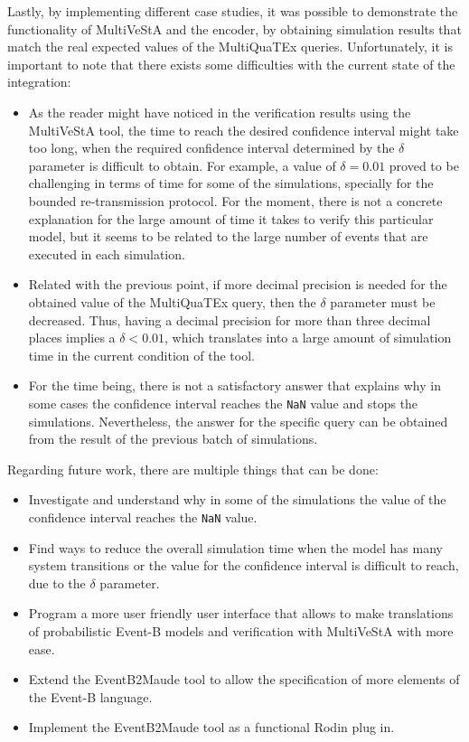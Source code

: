 Lastly, by implementing different case studies, it was possible to demonstrate the functionality of MultiVeStA and the encoder, by obtaining simulation results that match the real expected values of the MultiQuaTEx queries. Unfortunately, it is important to note that there exists some difficulties with the current state of the integration:
\begin{itemize}
    \item As the reader might have noticed in the verification results using the MultiVeStA tool, the time to reach the desired confidence interval might take too long, when the required confidence interval determined by the $\delta$ parameter is difficult to obtain. For example, a value of $\delta = 0.01$ proved to be challenging in terms of time for some of the simulations, specially for the bounded re-transmission protocol. For the moment, there is not a concrete explanation for the large amount of time it takes to verify this particular model, but it seems to be related to the large number of events that are executed in each simulation.
    
    \item Related with the previous point, if more decimal precision is needed for the obtained value of the MultiQuaTEx query, then the $\delta$ parameter must be decreased. Thus, having a decimal precision for more than three decimal places implies a $\delta < 0.01$, which translates into a large amount of simulation time in the current condition of the tool.

    \item For the time being, there is not a satisfactory answer that explains why in some cases the confidence interval reaches the \texttt{NaN} value and stops the simulations. Nevertheless, the answer for the specific query can be obtained from the result of the previous batch of simulations.
\end{itemize}

Regarding future work, there are multiple things that can be done:
\begin{itemize}
    \item Investigate and understand why in some of the simulations the value of the confidence interval reaches the \texttt{NaN} value.
    \item Find ways to reduce the overall simulation time when the model has many system transitions or the value for the confidence interval is difficult to reach, due to the $\delta$ parameter.
    \item Program a more user friendly user interface that allows to make translations of probabilistic Event-B models and verification with MultiVeStA with more ease.
    \item Extend the EventB2Maude tool to allow the specification of more elements of the Event-B language.
    \item Implement the EventB2Maude tool as a functional Rodin plug in.
\end{itemize}